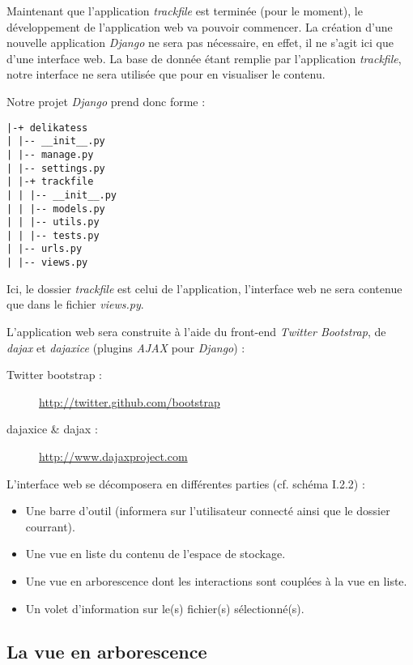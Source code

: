 Maintenant que l'application \textit{trackfile} est terminée (pour le moment), le développement de l'application web
va pouvoir commencer. La création d'une nouvelle application \textit{Django} ne sera pas nécessaire, en effet, il ne
s'agit ici que d'une interface web. La base de donnée étant remplie par l'application \textit{trackfile}, notre interface
ne sera utilisée que pour en visualiser le contenu.

Notre projet \textit{Django} prend donc forme :

\begin{verbatim}
|-+ delikatess
| |-- __init__.py
| |-- manage.py
| |-- settings.py
| |-+ trackfile
| | |-- __init__.py
| | |-- models.py
| | |-- utils.py
| | |-- tests.py
| |-- urls.py
| |-- views.py
\end{verbatim}

Ici, le dossier \textit{trackfile} est celui de l'application, l'interface web ne sera contenue que dans le fichier
\textit{views.py}.

L'application web sera construite à l'aide du front-end \textit{Twitter Bootstrap}, de \textit{dajax} et \textit{dajaxice}
(plugins \textit{AJAX} pour \textit{Django}) :

\begin{description}
     \item[Twitter bootstrap :] \url{http://twitter.github.com/bootstrap}
     \item[dajaxice \& dajax :] \url{http://www.dajaxproject.com}
\end{description}


L'interface web se décomposera en différentes parties (cf. schéma I.2.2) :

\begin{itemize}
     \item Une barre d'outil (informera sur l'utilisateur connecté ainsi que le dossier courrant).
     \item Une vue en liste du contenu de l'espace de stockage.
     \item Une vue en arborescence dont les interactions sont couplées à la vue en liste.
     \item Un volet d'information sur le(s) fichier(s) sélectionné(s).
\end{itemize}

\subsection{La vue en arborescence}

